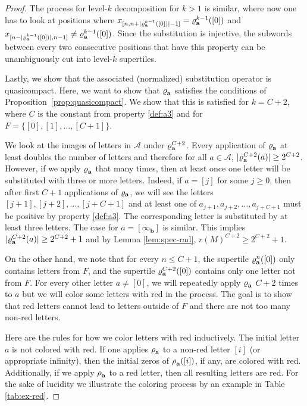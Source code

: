 \begin{proof}
The process for level-$k$ decomposition for $k>1$ is similar, where now one has to look at positions where $x_{[n,n+|\varrho^{k-1}_{\bf{a}}([0])|-1]}=\varrho^{k-1}_{\bf{a}}([0])$ and $x_{[n-|\varrho^{k-1}_{\bf{a}}([0])|,n-1]}\neq\varrho^{k-1}_{\bf{a}}([0])$. Since the substitution is injective, the subwords between every two consecutive positions that have this property can be unambiguously cut into level-$k$ supertiles. 

Lastly, we show that the associated (normalized) substitution operator is quasicompact. Here, we want to show that $\varrho^{ }_{\bf{a}}$ satisfies the conditions of Proposition~\ref{prop:quasicompact}. We show that this is satisfied for $k=C+2$, where $C$ is the constant from property \ref{def:a3} and for $F=\{[0],[1],\ldots,[C+1]\}$. 

We look at the images of letters in $\mathcal{A}$ under $\varrho^{C+2}_{\bf{a}}$. Every application of $\varrho^{ }_{\bf{a}}$ at least doubles the number of letters and therefore for all $a\in\mathcal{A}$, $|\varrho^{C+2}_{\bf{a}}(a)|\geq 2^{C+2}$. However, if we apply $\varrho^{ }_{\bf{a}}$ that many times, then at least once one letter will be substituted with three or more letters. Indeed, if $a=[j]$ for some $j\geq 0$, then after first $C+1$ applications of $\varrho_{\bf{a}}$, we will see the letters $[j+1], [j+2], \ldots, [j+C+1]$ and at least one of $a_{j+1}, a_{j+2}, \ldots, a_{j+C+1}$ must be positive by property \ref{def:a3}. The corresponding letter is substituted by at least three letters. The case for $a=[\infty_\mathbf b]$ is similar. This implies $|\varrho^{C+2}_{\bf{a}}(a)|\geq 2^{C+2}+1$ and by Lemma \ref{lem:spec-rad}, $r(M)^{C+2}\geq 2^{C+2}+1$.

On the other hand, we note that for every $n\leq C+1$, the supertile $\varrho^{n}_{\bf{a}}([0])$ only contains letters from $F$, and the supertile $\varrho^{C+2}_{\bf{a}}([0])$ contains only one letter not from $F$. For every other letter $a\neq [0]$, we will repeatedly apply $\varrho^{ }_{\bf{a}}$ $C+2$ times to $a$ but we will color some letters with red in the process. The goal is to show that red letters cannot lead to letters outside of $F$ and there are not too many non-red letters.

Here are the rules for how we color letters with red inductively. The initial letter $a$ is not colored with red. If one applies $\rho^{ }_{\bf{a}}$ to a non-red letter $[i]$ (or appropriate infinity), then the initial zeros of $\rho^{ }_{\bf{a}}([i])$, if any, are colored with red. Additionally, if we apply $\rho^{ }_{\bf{a}}$ to a red letter, then all resulting letters are red. For the sake of lucidity we illustrate the coloring process by an example in Table \ref{tab:ex-red}.


\end{proof}
